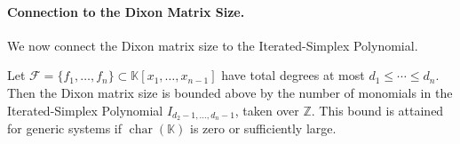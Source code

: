 \paragraph{Connection to the Dixon Matrix Size.}
We now connect the Dixon matrix size to the Iterated-Simplex Polynomial.

\begin{lemma}\label{lem:dixon_fc_bound}
Let $\mathcal F=\{f_1,\ldots,f_n\}\subset\mathbb K[x_1,\ldots,x_{n-1}]$ have total degrees at most $d_1\le\cdots\le d_n$. Then the Dixon matrix size is bounded above by the number of monomials in the Iterated-Simplex Polynomial $I_{d_2-1,\ldots,d_n-1}$, taken over $\mathbb Z$. This bound is attained for generic systems if $\operatorname{char}(\mathbb K)$ is zero or sufficiently large.
\end{lemma}

